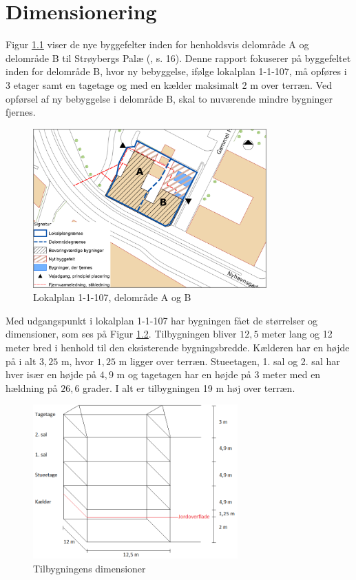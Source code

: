 \chapter{Dimensionering}

Figur \ref{fig:hej} viser de nye byggefelter inden for henholdsvis delområde A og delområde B til Strøybergs Palæ (\citep{lokalplan}, s. 16). Denne rapport fokuserer på byggefeltet inden for delområde B, hvor ny bebyggelse, ifølge lokalplan 1-1-107, må opføres i 3 etager samt en tagetage og med en kælder maksimalt 2 m over terræn. Ved opførsel af ny bebyggelse i delområde B, skal to nuværende mindre bygninger fjernes. 

\begin{figure}[htbp]
	\centering
	\includegraphics[width=0.8\textwidth]{billeder/signatur.png}
	\caption{Lokalplan 1-1-107, delområde A og B \citep{lokalplan[ bilag 2, s. 35]}}
	\label{fig:hej}
\end{figure}

Med udgangspunkt i lokalplan 1-1-107 har bygningen fået de størrelser og dimensioner, som ses på Figur \ref{fig:farvel}.
\newline \indent{     }  Tilbygningen bliver $12,\!5$ meter lang og 12 meter bred i henhold til den eksisterende bygningsbredde. Kælderen har en højde på i alt $3,\!25$ m, hvor $1,\!25$ m ligger over terræn. Stueetagen, 1. sal og 2. sal har hver især en højde på $4,\!9$ m og tagetagen har en højde på 3 meter med en hældning på $26,\!6$ grader. I alt er tilbygningen 19 m høj over terræn.

\begin{figure}[htbp]
	\centering
	\includegraphics[width=0.7\textwidth]{billeder/tilbygning2.png}
	\caption{Tilbygningens dimensioner}
	\label{fig:farvel}
\end{figure}

